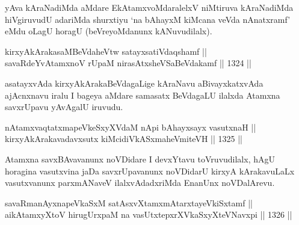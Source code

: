 \begin{artha}
yAva kAraNadiMda aMdare EkAtamxvoMdaralelxV niMtiruva kAraNadiMda hiVgiruvudU adariMda shurxtiyu `na bAhayxM kiMcana veVda nAnatxramf' eMdu oLagU horagU (beVreyoMdanunx kANuvudilalx).
\end{artha}


\begin{shl}
kirxyAkAraka\footnotemark[2]saMBeVdaheVtw satayxsatiVdaqshamf || \\
savaRdeYvA\s \s tamxnoV rUpaM nirasAtxsheVSaBeVdakamf \hfill || 1324 ||  
\end{shl}

\begin{artha}
asatayxvAda kirxyAkArakaBeVdagaLige kAraNavu aBivayxkatxvAda ajAcnxnavu iralu I bageya aMdare samasatx BeVdagaLU ilalxda Atamxna savxrUpavu yAvAgalU iruvudu.
\end{artha}

\begin{shl}
nA\s \s tamx\footnotemark[1]vaqtatxmapeVkeSxyXVdaM nApi bAhayxsayx vasutxnaH || \\
kirxyAkArakavadavxsutx kiMcidiVkASxmaheV\s miteVH \hfill || 1325 ||
\end{shl}

\begin{artha}
Atamxna savxBAvavanunx noVDidare I devxYtavu toVruvudilalx, hAgU horagina vasutxvina jaDa savxrUpavanunx noVDidarU kirxyA kArakavuLaLx vasutxvanunx parxmANaveV ilalxvAdadxriMda EnanUnx noVDalArevu.
\end{artha}


\begin{shl}
savaRmanAyxnapeVkaSxM satAsxvXtamxmAtarxtayeVkiSxtamf || \\
aikAtamxyXtoV \footnotemark[2]hirugUrxpaM na vasUtxtepxrXVkaSxyXteV\s Navxpi \hfill || 1326 ||  
\end{shl}

